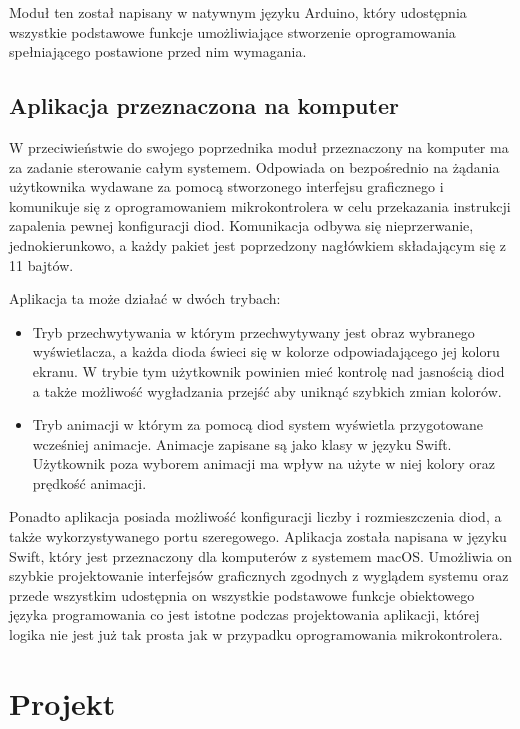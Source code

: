 \documentclass[12pt]{report}
\begin{document}
Moduł ten został napisany w natywnym języku Arduino, który udostępnia wszystkie podstawowe funkcje umożliwiające stworzenie oprogramowania spełniającego postawione przed nim wymagania.

\subsection{Aplikacja przeznaczona na komputer}

W przeciwieństwie do swojego poprzednika moduł przeznaczony na komputer ma za zadanie sterowanie całym systemem. Odpowiada on bezpośrednio na żądania użytkownika wydawane za pomocą stworzonego interfejsu graficznego i komunikuje się z oprogramowaniem mikrokontrolera w celu przekazania instrukcji zapalenia pewnej konfiguracji diod. Komunikacja odbywa się nieprzerwanie, jednokierunkowo, a każdy pakiet jest poprzedzony nagłówkiem składającym się z 11 bajtów.

Aplikacja ta może działać w dwóch trybach:

\begin{itemize}
	\item Tryb przechwytywania w którym przechwytywany jest obraz wybranego wyświetlacza, a każda dioda świeci się w kolorze odpowiadającego jej koloru ekranu. W trybie tym użytkownik powinien mieć kontrolę nad jasnością diod a także możliwość wygładzania przejść aby uniknąć szybkich zmian kolorów.
	\item Tryb animacji w którym za pomocą diod system wyświetla przygotowane wcześniej animacje. Animacje zapisane są jako klasy w języku Swift. Użytkownik poza wyborem animacji ma wpływ na użyte w niej kolory oraz prędkość animacji.
\end{itemize}

Ponadto aplikacja posiada możliwość konfiguracji liczby i rozmieszczenia diod, a także wykorzystywanego portu szeregowego.
Aplikacja została napisana w języku Swift, który jest przeznaczony dla komputerów z systemem macOS. Umożliwia on szybkie projektowanie interfejsów graficznych zgodnych z wyglądem systemu oraz przede wszystkim udostępnia on wszystkie podstawowe funkcje obiektowego języka programowania co jest istotne podczas projektowania aplikacji, której logika nie jest już tak prosta jak w przypadku oprogramowania mikrokontrolera.

\section{Projekt}
\end{document}
